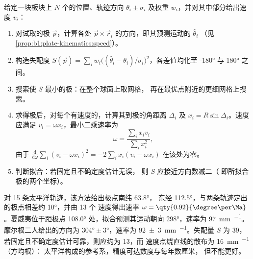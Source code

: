 \begin{method}[由热点轨迹拟合欧拉极与速率]\label{met:b1:hotspots:pole-fit}
给定一块板块上 $N$ 个的位置、轨迹方向
$\theta_i \pm \sigma_i$ 及权重 $w_i$，并对其中部分给出速度
$v_i$：
\begin{enumerate}
  \item 对试取的极 $\vec p$，计算各处
        $\vec p\times\vec r_i$ 的方向，即其预测运动的 $\hat\theta_i$
        （见\cref{prop:b1:plate-kinematics:speed}）。
  \item 构造失配度 $S(\vec p) = \sum_i w_i\bigl((\hat\theta_i -
        \theta_i)/\sigma_i\bigr)^2$，各差值均化至
        \ang{-180} 与 \ang{180} 之间。
  \item 搜索使 $S$ 最小的极：在整个球面上取网格，
        再在最优点附近的更细网格上搜索。
  \item 求得极后，对每个有速度的，计算其到极的角距离 $\Delta_i$
        及 $x_i = R\sin\Delta_i$。速度应满足
        $v_i = \omega x_i$，最小二乘速率为
        \[
          \omega = \frac{\sum_i x_i v_i}{\sum_i x_i^2},
        \]
        由于 $\frac{\mathrm d}{\mathrm d\omega}\sum_i (v_i - \omega x_i)^2 =
        -2\sum_i x_i(v_i - \omega x_i)$ 在该处为零。
  \item 判断拟合：若固定且不确定度估计无误，
        则 $S$ 应接近方向数减二（
        即所拟合极的两个坐标）。
\end{enumerate}
\end{method}

对 15 条太平洋轨迹，该方法给出极点南纬 \ang{63.8}，
东经 \ang{112.5}，与两条轨迹定出的极点相差约 \ang{10}，并由 13 个
速度得出速率 $\omega = \qty{0.92}{\degree\per\Ma}$。夏威夷位于距极点 \ang{108.0}
处，拟合预测其运动朝向 \ang{298}，速率为
\qty{97}{mm.^{-1}}。摩尔根二人给出的方向为 $\ang{304}\pm\ang{3}$，速率为
\qty[uncertainty-mode=separate]{92 \pm 3}{mm.^{-1}}。失配量 $S$ 为 39，
若固定且不确定度估计可靠，则应约为 13，而
速度点绕直线的散布为 \qty{16}{mm.^{-1}}（方均根）：
太平洋构成的参考系，精度可达数度与每年数厘米，
但不能更好。


